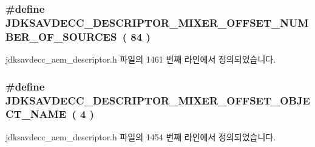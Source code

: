 \subsubsection[{\texorpdfstring{J\+D\+K\+S\+A\+V\+D\+E\+C\+C\+\_\+\+D\+E\+S\+C\+R\+I\+P\+T\+O\+R\+\_\+\+M\+I\+X\+E\+R\+\_\+\+O\+F\+F\+S\+E\+T\+\_\+\+N\+U\+M\+B\+E\+R\+\_\+\+O\+F\+\_\+\+S\+O\+U\+R\+C\+ES}{JDKSAVDECC_DESCRIPTOR_MIXER_OFFSET_NUMBER_OF_SOURCES}}]{\setlength{\rightskip}{0pt plus 5cm}\#define J\+D\+K\+S\+A\+V\+D\+E\+C\+C\+\_\+\+D\+E\+S\+C\+R\+I\+P\+T\+O\+R\+\_\+\+M\+I\+X\+E\+R\+\_\+\+O\+F\+F\+S\+E\+T\+\_\+\+N\+U\+M\+B\+E\+R\+\_\+\+O\+F\+\_\+\+S\+O\+U\+R\+C\+ES~( 84 )}\hypertarget{group__descriptor__mixer_ga300d6137b8e56f28d26a677257361587}{}\label{group__descriptor__mixer_ga300d6137b8e56f28d26a677257361587}


jdksavdecc\+\_\+aem\+\_\+descriptor.\+h 파일의 1461 번째 라인에서 정의되었습니다.

\subsubsection[{\texorpdfstring{J\+D\+K\+S\+A\+V\+D\+E\+C\+C\+\_\+\+D\+E\+S\+C\+R\+I\+P\+T\+O\+R\+\_\+\+M\+I\+X\+E\+R\+\_\+\+O\+F\+F\+S\+E\+T\+\_\+\+O\+B\+J\+E\+C\+T\+\_\+\+N\+A\+ME}{JDKSAVDECC_DESCRIPTOR_MIXER_OFFSET_OBJECT_NAME}}]{\setlength{\rightskip}{0pt plus 5cm}\#define J\+D\+K\+S\+A\+V\+D\+E\+C\+C\+\_\+\+D\+E\+S\+C\+R\+I\+P\+T\+O\+R\+\_\+\+M\+I\+X\+E\+R\+\_\+\+O\+F\+F\+S\+E\+T\+\_\+\+O\+B\+J\+E\+C\+T\+\_\+\+N\+A\+ME~( 4 )}\hypertarget{group__descriptor__mixer_ga209978f1f3ade5c2822f3e4e104a39ba}{}\label{group__descriptor__mixer_ga209978f1f3ade5c2822f3e4e104a39ba}


jdksavdecc\+\_\+aem\+\_\+descriptor.\+h 파일의 1454 번째 라인에서 정의되었습니다.

